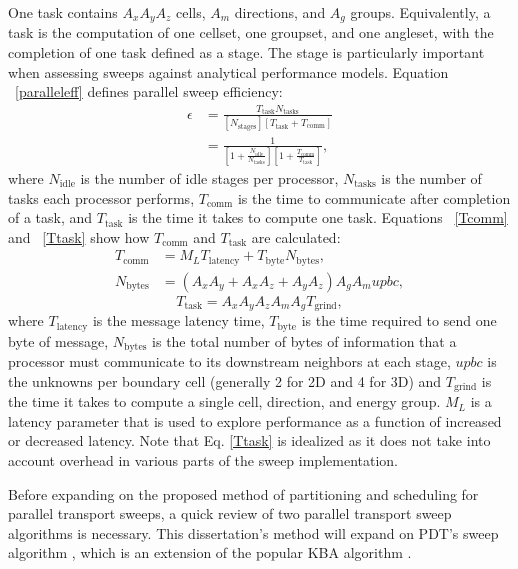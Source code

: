 One task contains $A_x A_y A_z$ cells, $A_m$ directions, and $A_g$ groups. Equivalently, a task is the computation of one cellset, one groupset, and one angleset, with the completion of one task defined as a stage.  The stage is particularly important when assessing sweeps against analytical performance models. 
Equation ~\eqref{paralleleff} defines parallel sweep efficiency:
\begin{equation}\label{paralleleff}
\begin{split}
\epsilon &= \frac{T_{\text{task}} N_{\text{tasks}}}{[N_{\text{stages}}] [T_{\text{task}} + T_{\text{comm}}]} \\
            &=\frac{1}{[1+\frac{N_{\text{idle}}}{N_{\text{tasks}}}][1 + \frac{T_{\text{comm}}}{T_{\text{task}}}]},
\end{split}
\end{equation}
where $N_\text{idle}$ is the number of idle stages per processor, $N_\text{tasks}$ is the number of tasks each processor performs, $T_\text{comm}$ is the time to communicate after completion of a task, and $T_\text{task}$ is the time it takes to compute one task.
Equations ~\eqref{Tcomm} and ~\eqref{Ttask} show how $T_{\text{comm}}$ and $T_{\text{task}}$ are calculated:
\begin{align}
T_{\text{comm}} &= M_L T_{\text{latency}} + T_{\text{byte}} N_{\text{bytes}}, \\
N_{\text{bytes}} &= (A_x A_y + A_x A_z + A_y A_z)A_g A_m upbc,
\label{Tcomm}
\end{align}
\begin{equation}
T_{\text{task}} = A_x A_y A_z A_m A_g T_{\text{grind}},
\label{Ttask}
\end{equation}
where $T_{\text{latency}}$ is the message latency time, $T_{\text{byte}}$ is the time required to send one byte of message, $N_{\text{bytes}}$ is the total number of bytes of information that a processor must communicate to its downstream neighbors at each stage, $upbc$ is the unknowns per boundary cell (generally 2 for 2D and 4 for 3D) and $T_{\text{grind}}$ is the time it takes to compute a single cell, direction, and energy group. $M_L$ is a latency parameter that is used to explore performance as a function of increased or decreased latency. Note that Eq. \ref{Ttask} is idealized as it does not take into account overhead in various parts of the sweep implementation.

Before expanding on the proposed method of partitioning and scheduling for parallel transport sweeps, a quick review of two parallel transport sweep algorithms is necessary. This dissertation's method will expand on PDT's sweep algorithm \cite{mpadams2013,mpadams2015}, which is an extension of the popular KBA algorithm \cite{KBA}.

